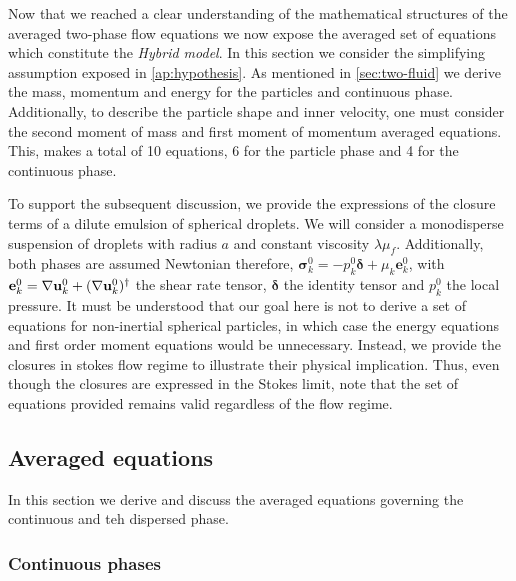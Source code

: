 


Now that we reached a clear understanding of the mathematical structures of the averaged two-phase flow equations we now expose the averaged set of equations which constitute the \textit{Hybrid model}. 
In this section we consider the simplifying assumption exposed in \ref{ap:hypothesis}. 
As mentioned in \ref{sec:two-fluid} we derive the mass, momentum and energy for the particles and continuous phase. 
Additionally, to describe the particle shape and inner velocity, one must consider the second moment of mass and first moment of momentum averaged equations. 
This, makes a total of 10 equations, 6 for the particle phase and 4 for the continuous phase.

To support the subsequent discussion, we provide the expressions of the closure terms of a dilute emulsion of spherical droplets. 
We will consider a monodisperse suspension of droplets with radius $a$ and constant viscosity $\lambda \mu_f$. 
Additionally, both phases are assumed Newtonian therefore, $\bm{\sigma}_k^0 = - p_k^0 \bm\delta + \mu_k \textbf{e}_k^0$, with $\textbf{e}_k^0 = \mathbf{\nabla} \textbf{u}_k^0+(\mathbf{\nabla} \textbf{u}_k^0)^\dagger$ the shear rate tensor, $\bm\delta$ the identity tensor and $p_k ^0$ the local pressure. 
It must be understood that our goal here is not to derive a set of equations for non-inertial spherical particles, in which case the energy equations and first order moment equations would be unnecessary. 
Instead, we provide the closures in stokes flow regime to illustrate their physical implication. 
Thus, even though the closures are expressed in the Stokes limit, note that the set of equations provided remains valid regardless of the flow regime.

\subsection{Averaged equations}

In this section we derive and discuss the averaged equations governing the continuous and teh dispersed  phase. 

\subsubsection{Continuous phases}


